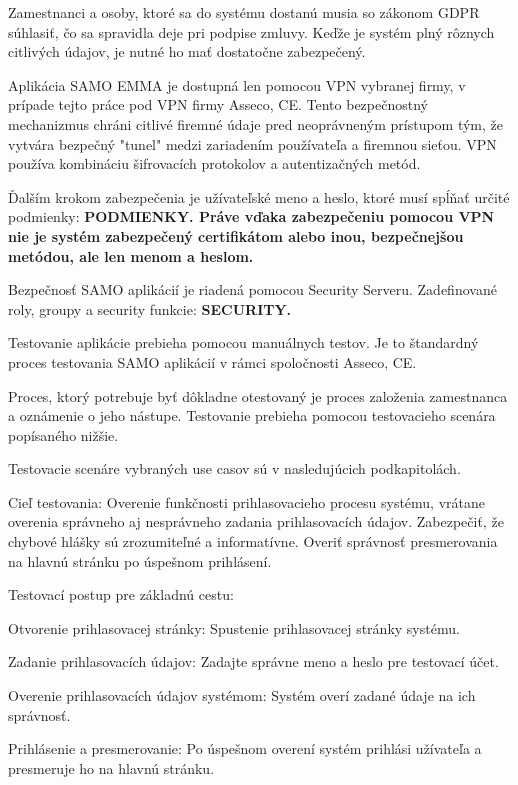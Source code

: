 Zamestnanci a osoby, ktoré sa do systému dostanú musia so zákonom GDPR súhlasiť, čo sa spravidla deje pri podpise zmluvy. Keďže je systém plný rôznych citlivých údajov, je nutné ho mať dostatočne zabezpečený.

Aplikácia SAMO EMMA je dostupná len pomocou VPN vybranej firmy, v prípade tejto práce pod VPN firmy Asseco, CE. Tento bezpečnostný mechanizmus chráni citlivé firemné údaje pred neoprávneným prístupom tým, že vytvára bezpečný "tunel" medzi zariadením používateľa a firemnou sieťou. VPN používa kombináciu šifrovacích protokolov a autentizačných metód.

Ďalším krokom zabezpečenia je užívateľské meno a heslo, ktoré musí spĺňať určité podmienky: \start\bf PODMIENKY\stop. Práve vďaka zabezpečeniu pomocou VPN nie je systém zabezpečený certifikátom alebo inou, bezpečnejšou metódou, ale len menom a heslom.

Bezpečnosť SAMO aplikácií je riadená pomocou Security Serveru. Zadefinované roly, groupy a security funkcie: \start\bf SECURITY\stop.


Testovanie aplikácie prebieha pomocou manuálnych testov. Je to štandardný proces testovania SAMO aplikácií v rámci spoločnosti Asseco, CE. 

Proces, ktorý potrebuje byť dôkladne otestovaný je proces založenia zamestnanca a oznámenie o jeho nástupe. Testovanie prebieha pomocou testovacieho scenára popísaného nižšie.

Testovacie scenáre vybraných use casov sú v nasledujúcich podkapitolách.

Cieľ testovania: Overenie funkčnosti prihlasovacieho procesu systému, vrátane overenia správneho aj nesprávneho zadania prihlasovacích údajov. Zabezpečiť, že chybové hlášky sú zrozumiteľné a informatívne. Overiť správnosť presmerovania na hlavnú stránku po úspešnom prihlásení.

\blank
Testovací postup pre základnú cestu:

\startitemize[n]
\item{Otvorenie prihlasovacej stránky: Spustenie prihlasovacej stránky systému.}
\item{Zadanie prihlasovacích údajov: Zadajte správne meno a heslo pre testovací účet.}
\item{Overenie prihlasovacích údajov systémom: Systém overí zadané údaje na ich správnosť.}
\item{Prihlásenie a presmerovanie: Po úspešnom overení systém prihlási užívateľa a presmeruje ho na hlavnú stránku.}
\stopitemize

